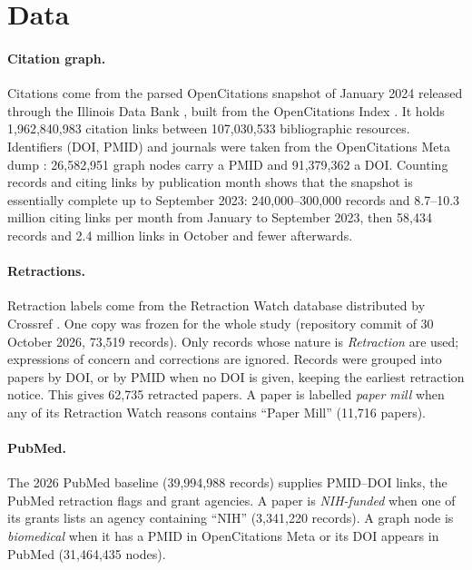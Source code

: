 \section{Data}\label{sec:data}

\paragraph{Citation graph.} Citations come from the parsed OpenCitations snapshot of January 2024 released through
the Illinois Data Bank \citep{arjomandi2024dataset}, built from the OpenCitations Index \citep{peroni2020opencitations,heibi2019coci}.
It holds 1,962,840,983 citation links between 107,030,533 bibliographic resources. Identifiers (DOI, PMID) and journals
were taken from the OpenCitations Meta dump \citep{massari2024meta,ocmeta2024dump}: 26,582,951 graph nodes carry a PMID
and 91,379,362 a DOI. Counting records and citing links by publication month shows that the snapshot is essentially
complete up to September 2023: 240,000--300,000 records and 8.7--10.3 million citing links per month from January to
September 2023, then 58,434 records and 2.4 million links in October and fewer afterwards.

\paragraph{Retractions.} Retraction labels come from the Retraction Watch database distributed by Crossref
\citep{rittman2025rw}. One copy was frozen for the whole study (repository commit of 30 October 2026, 73,519 records).
Only records whose nature is \emph{Retraction} are used; expressions of concern and corrections are ignored. Records
were grouped into papers by DOI, or by PMID when no DOI is given, keeping the earliest retraction notice. This gives
62,735 retracted papers. A paper is labelled \emph{paper mill} when any of its Retraction Watch reasons contains ``Paper
Mill'' (11,716 papers).

\paragraph{PubMed.} The 2026 PubMed baseline (39,994,988 records) supplies PMID--DOI links, the PubMed retraction flags
and grant agencies. A paper is \emph{NIH-funded} when one of its grants lists an agency containing ``NIH''
(3,341,220 records). A graph node is \emph{biomedical} when it has a PMID in OpenCitations Meta or its DOI appears in
PubMed (31,464,435 nodes).

